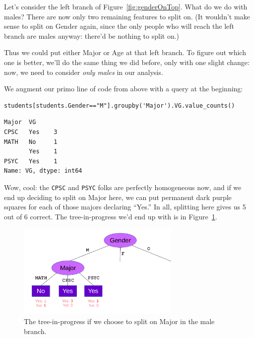 
Let's consider the left branch of Figure~\ref{fig:genderOnTop}. What do we do
with males? There are now only two remaining features to split on. (It wouldn't
make sense to split on \textsf{Gender} again, since the only people who will
reach the left branch are males anyway: there'd be nothing to split on.)

Thus we could put either \textsf{Major} or \textsf{Age} at that left branch. To
figure out which one is better, we'll do the same thing we did before, only
with one slight change: now, we need to consider \textit{only males} in our
analysis.

We augment our primo line of code from above with a query at the beginning:

\begin{Verbatim}[fontsize=\small,samepage=true,frame=single,framesep=3mm]
students[students.Gender=="M"].groupby('Major').VG.value_counts()
\end{Verbatim}
\vspace{-.2in}

\begin{Verbatim}[fontsize=\small,samepage=true,frame=leftline,framesep=5mm,framerule=1mm]
Major  VG 
CPSC   Yes    3
MATH   No     1
       Yes    1
PSYC   Yes    1
Name: VG, dtype: int64
\end{Verbatim}

Wow, cool: the \texttt{CPSC} and \texttt{PSYC} folks are perfectly homogeneous
now, and if we end up deciding to split on \textsf{Major} here, we can put
permanent dark purple squares for each of those majors declaring ``Yes.'' In
all, splitting here gives us 5 out of 6 correct. The tree-in-progress we'd end
up with is in Figure~\ref{fig:maleMajorSplit}.

\begin{figure}[ht]
\centering
\includegraphics[width=0.7\textwidth]{maleMajorSplit.png}
\caption{The tree-in-progress if we choose to split on \textsf{Major} in the
male branch.}
\label{fig:maleMajorSplit}
\end{figure}

